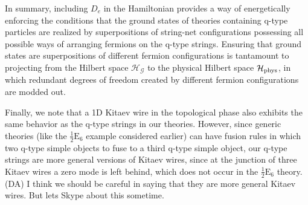 \documentclass[12pt,a4paper]{article}
\newcommand{\mcg}{\mathcal{G}}
\newcommand{\mch}{\mathcal{H}}
\newcommand{\dave}[1]{{\color{ao(english)}\footnotesize{(DA) #1}}}
\newcommand{\halfesix}{\frac{1}{2}\text{E}_6}
\begin{document}
In summary, including $D_e$ in the Hamiltonian provides a way of energetically enforcing the conditions that the ground states of theories containing q-type particles are realized by superpositions of string-net configurations possessing all possible ways of arranging fermions on the q-type strings. 
Ensuring that ground states are superpositions of different fermion configurations is tantamount to projecting from the Hilbert space $\mch_\mcg$ to the physical Hilbert space $\mch_{\rm phys}$, in which redundant degrees of freedom created by different fermion configurations are modded out.%


Finally, we note that a 1D Kitaev wire in the topological phase also exhibits the same behavior as the q-type strings in our theories.
However, since generic theories (like the $\halfesix$ example considered earlier) can have fusion rules in which two q-type simple objects to fuse to a third q-type simple object, our q-type strings are more general versions of Kitaev wires, since at the junction of three Kitaev wires a zero mode is left behind, which does not occur in the $\halfesix$ theory. 
\dave{I think we should be careful in saying that they are more general Kitaev wires.
But lets Skype about this sometime.}





\end{document}
